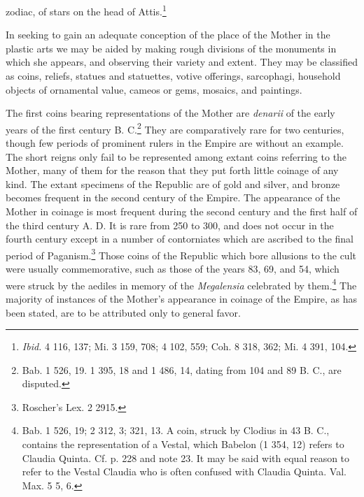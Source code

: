 \documentclass[a4paper, 11pt, oneside, polutonikogreek, english]{article}
\begin{document}
zodiac, of stars on the head of Attis.\footnote{\emph{Ibid.} 4 116, 137; Mi. 3 159, 708; 4 102, 559; Coh. 8 318, 362; Mi. 4 391, 104.}

In seeking to gain an adequate conception of the place of the Mother in the plastic arts we may be aided by making rough divisions of the monuments in which she appears, and observing their variety and extent. They may be classified as coins, reliefs, statues and statuettes, votive offerings, sarcophagi, household objects of ornamental value, cameos or gems, mosaics, and paintings.

The first coins bearing representations of the Mother are \emph{denarii} of the early years of the first century B. C.\footnote{Bab. 1 526, 19. 1 395, 18 and 1 486, 14, dating from 104 and 89 B. C., are disputed.} They are comparatively rare for two centuries, though few periods of prominent rulers in the Empire are without an example. The short reigns only fail to be represented among extant coins referring to the Mother, many of them for the reason that they put forth little coinage of any kind. The extant specimens of the Republic are of gold and silver, and bronze becomes frequent in the second century of the Empire. The appearance of the Mother in coinage is most frequent during the second century and the first half of the third century A. D. It is rare from 250 to 300, and does not occur in the fourth century except in a number of contorniates which are ascribed to the final period of Paganism.\footnote{Roscher's Lex. 2 2915.} Those coins of the Republic which bore allusions to the cult were usually commemorative, such as those of the years 83, 69, and 54, which were struck by the aediles in memory of the \emph{Megalensia} celebrated by them.\footnote{Bab. 1 526, 19; 2 312, 3; 321, 13. A coin, struck by Clodius in 43 B. C., contains the representation of a Vestal, which Babelon (1 354, 12) refers to Claudia Quinta. Cf. p. 228 and note 23. It may be said with equal reason to refer to the Vestal Claudia who is often confused with Claudia Quinta. Val. Max. 5 5, 6.} The majority of instances of the Mother's appearance in coinage of the Empire, as has been stated, are to be attributed only to general favor.
\end{document}
